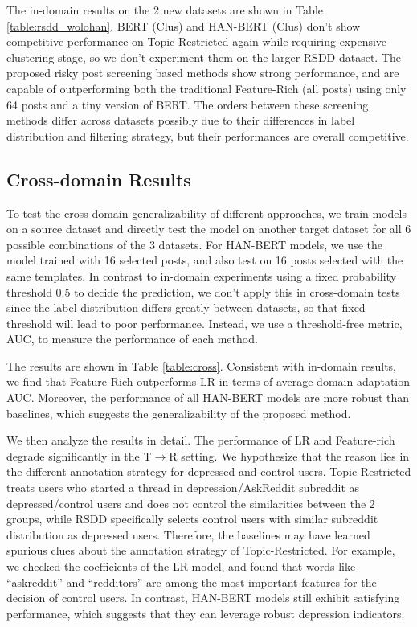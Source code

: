 \documentclass{article}
\begin{document}
The in-domain results on the 2 new datasets are shown in Table \ref{table:rsdd_wolohan}. BERT (Clus) and HAN-BERT (Clus) don't show competitive performance on Topic-Restricted again while requiring expensive clustering stage, so we don't experiment them on the larger RSDD dataset. The proposed risky post screening based methods show strong performance, and are capable of outperforming both the traditional Feature-Rich (all posts) using only 64 posts and a tiny version of BERT. The orders between these screening methods differ across datasets possibly due to their differences in label distribution and filtering strategy, but their performances are overall competitive.

\subsection{Cross-domain Results}

To test the cross-domain generalizability of different approaches, we train models on a source dataset and directly test the model on another target dataset for all 6 possible combinations of the 3 datasets. For HAN-BERT models, we use the model trained with 16 selected posts, and also test on 16 posts selected with the same templates. In contrast to in-domain experiments using a fixed probability threshold 0.5 to decide the prediction, we don't apply this in cross-domain tests since the label distribution differs greatly between datasets, so that fixed threshold will lead to poor performance. Instead, we use a threshold-free metric, AUC, to measure the performance of each method.

The results are shown in Table \ref{table:cross}. Consistent with in-domain results, we find that Feature-Rich outperforms LR in terms of average domain adaptation AUC. Moreover, the performance of all HAN-BERT models are more robust than baselines, which suggests the generalizability of the proposed method.

We then analyze the results in detail. The performance of LR and Feature-rich degrade significantly in the T$\rightarrow$R setting. We hypothesize that the reason lies in the different annotation strategy for depressed and control users. Topic-Restricted treats users who started a thread in depression/AskReddit subreddit as depressed/control users and does not control the similarities between the 2 groups, while RSDD specifically selects control users with similar subreddit distribution as depressed users. Therefore, the baselines may have learned spurious clues about the annotation strategy of Topic-Restricted. For example, we checked the coefficients of the LR model, and found that words like ``askreddit'' and ``redditors'' are among the most important features for the decision of control users. In contrast, HAN-BERT models still exhibit satisfying performance, which suggests that they can leverage robust depression indicators. 
\end{document}
